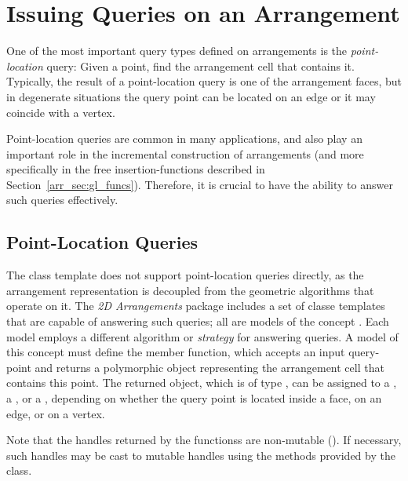 \section{Issuing Queries on an Arrangement\label{arr_sec:queries}}
One of the most important query types defined on arrangements is
the \emph{point-location} query: Given a point, find the arrangement
cell that contains it. Typically, the result of a point-location
query is one of the arrangement faces, but in degenerate situations
the query point can be located on an edge or it may coincide with a
vertex.

Point-location queries are common in many applications, and also
play an important role in the incremental construction of arrangements
(and more specifically in the free insertion-functions described in
Section~\ref{arr_sec:gl_funcs}). Therefore, it is crucial to have the
ability to answer such queries effectively.

\subsection{Point-Location Queries\label{arr_ssec:pl}}
The  class template does not support point-location
queries directly, as the arrangement representation is decoupled from
the geometric algorithms that operate on it. The \emph{2D Arrangements}
package includes a set of classe templates that are capable of
answering such queries;  all are models of the concept
. Each model employs a different
algorithm or \emph{strategy} for answering queries. A model of this
concept must define the  member function, which accepts an
input query-point and returns a polymorphic object representing the
arrangement cell that contains this point. The returned object, which is
of type , can be assigned to a ,
a , or a , depending
on whether the query point is located inside a face, on an edge, or on a
vertex.

Note that the handles returned by the  functionss are
non-mutable (). If necessary, such handles may
be cast to mutable handles using the  methods
 provided by the
 class.

